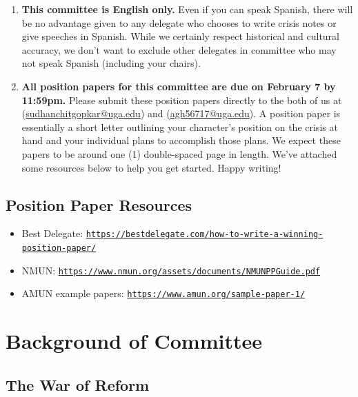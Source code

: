 \documentclass[10pt, letterpaper]{article}
\begin{document}
\begin{enumerate}
\def\labelenumi{\arabic{enumi}.}
\setcounter{enumi}{6}
\item
  
  \textbf{This committee is English only.} Even if you can speak
  Spanish, there will be no advantage given to any delegate who chooses
  to write crisis notes or give speeches in Spanish. While we certainly
  respect historical and cultural accuracy, we don't want to exclude
  other delegates in committee who may not speak Spanish (including your
  chairs).
  
\item
  
  \textbf{All position papers for this committee are due on February 7
  by 11:59pm.} Please submit these position papers directly to the both
  of us at
  (\href{mailto:sudhanchitgopkar@uga.edu}{{sudhanchitgopkar@uga.edu}})
  and (\href{mailto:agh56717@uga.edu}{{agh56717@uga.edu}}). A
  position paper is essentially a short letter outlining your
  character's position on the crisis at hand and your individual plans
  to accomplish those plans. We expect these papers to be around one (1)
  double-spaced page in length. We've attached some resources below to
  help you get started. Happy writing!
  
\end{enumerate}

\subsection{Position Paper Resources}
\begin {itemize}
\item
Best Delegate:
\texttt{\href{https://bestdelegate.com/how-to-write-a-winning-position-paper/}{{https://bestdelegate.com/how-to-write-a-winning-position-paper/}}}
\item
NMUN:
\texttt{\href{https://www.nmun.org/assets/documents/NMUNPPGuide.pdf}{{https://www.nmun.org/assets/documents/NMUNPPGuide.pdf}}}
\item
AMUN example papers:
\texttt{\href{https://www.amun.org/sample-paper-1/}{{https://www.amun.org/sample-paper-1/}}}
\end{itemize}
\newpage
\section{{Background of Committee}}

\subsection{The War of Reform}
\end{document}
